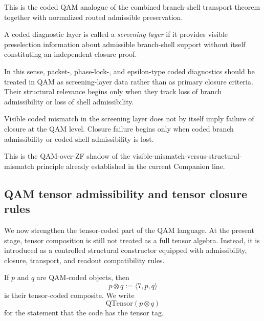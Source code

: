 \begin{remark}
This is the coded QAM analogue of the combined branch-shell transport theorem together with normalized routed admissible preservation.
\end{remark}

\begin{definition}
A coded diagnostic layer is called a \emph{screening layer} if it provides visible preselection information about admissible branch-shell support without itself constituting an independent closure proof.
\end{definition}

\begin{remark}
In this sense, packet-, phase-lock-, and epsilon-type coded diagnostics should be treated in QAM as screening-layer data rather than as primary closure criteria. Their structural relevance begins only when they track loss of branch admissibility or loss of shell admissibility.
\end{remark}

\begin{corollary}\label{cor:qam-visible-structural}
Visible coded mismatch in the screening layer does not by itself imply failure of closure at the QAM level. Closure failure begins only when coded branch admissibility or coded shell admissibility is lost.
\end{corollary}

\begin{remark}
This is the QAM-over-ZF shadow of the visible-mismatch-versus-structural-mismatch principle already established in the current Companion line.
\end{remark}


\subsection*{QAM tensor admissibility and tensor closure rules}

We now strengthen the tensor-coded part of the QAM language. At the present stage, tensor composition is still not treated as a full tensor algebra. Instead, it is introduced as a controlled structural constructor equipped with admissibility, closure, transport, and readout compatibility rules.

\begin{definition}
If $p$ and $q$ are QAM-coded objects, then
\[
p\otimes q := \langle 7,p,q\rangle
\]
is their tensor-coded composite. We write
\[
\mathrm{QTensor}(p\otimes q)
\]
for the statement that the code has the tensor tag.
\end{definition}

